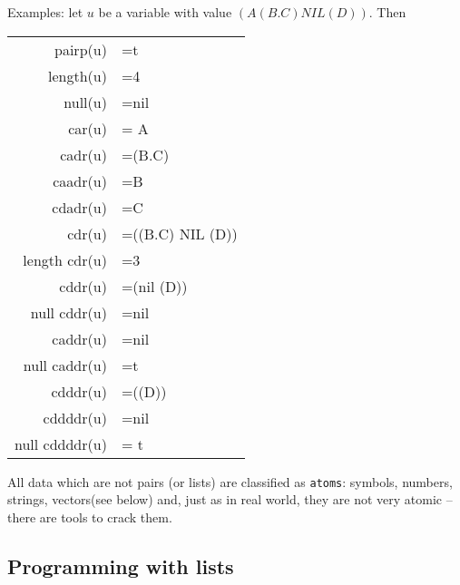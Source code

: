\documentclass[11pt]{article}
\makeatletter
\newcommand{\ttindex}[1]{\index{#1@{\texttt{#1}}}}
\makeatother
\begin{document}
{\nopagebreak[3]
Examples: let $u$ be a variable with value $(A (B.C) NIL (D))$.  Then
\begin{center}
\begin{tabular}{rl}
  pairp(u)   &=t\\ 
  length(u)  &=4\\
  null(u)    &=nil\\
  car(u)     & = A\\
  cadr(u)    &=(B.C)\\
  caadr(u)   &=B\\
  cdadr(u)   &=C\\
  cdr(u)     &=((B.C) NIL (D))\\
  length cdr(u)&=3\\
  cddr(u)    &=(nil (D))\\
  null cddr(u) &=nil\\
  caddr(u)     &=nil\\
  null caddr(u)&=t\\
  cdddr(u)   &=((D))\\
  cddddr(u)  &=nil\\
  null cddddr(u)  &= t\\
\end{tabular}
\end{center}
}

All data which are not pairs (or lists) are classified
as {\tt atoms}\ttindex{atom}: symbols, numbers, strings, vectors(see below)
and, just as in real world, they are not very atomic -- there
are tools to crack them.

\subsection{Programming with lists}
\end{document}
